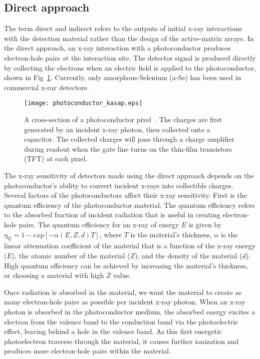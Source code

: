 \subsection{Direct approach}
The term direct and indirect refers to the outputs of initial x-ray interactions with the detection material rather than the design of the active-matrix arrays.  In the direct approach, an x-ray interaction with a photoconductor produces electron-hole pairs at the interaction site.  The detector signal is produced directly by collecting the electrons when an electric field is applied to the photoconductor, shown in Fig~\ref{fig:photoconductor_cross_section}.  Currently, only amorphous-Selenium (a-Se) has been used in commercial x-ray detectors.
%
\begin{figure}[ht]
\centering
\texttt{[image: photoconductor\_kasap.eps]}
\caption{A cross-section of a photoconductor pixel~\citep{kasap2006}.  The charges are first generated by an incident x-ray photon, then collected onto a capacitor.  The collected charges will pass through a charge amplifier during readout when the gate line turns on the thin-film transistors (TFT) at each pixel.}
\label{fig:photoconductor_cross_section}
\end{figure}

The x-ray sensitivity of detectors made using the direct approach depends on the photoconductor's ability to convert incident x-rays into collectible charges.  Several factors of the photoconductors affect their x-ray sensitivity.  First is the quantum efficiency of the photoconductor material.  The quantum efficiency refers to the absorbed fraction of incident radiation that is useful in creating electron-hole pairs.  The quantum efficiency for an x-ray of energy $E$ is given by $\eta_Q = 1 - exp[-\alpha (E, Z, d) T]$, where $T$ is the material's thickness, $\alpha$ is the linear attenuation coefficient of the material that is a function of the x-ray energy ($E$), the atomic number of the material ($Z$), and the density of the material ($d$).  High quantum efficiency can be achieved by increasing the material's thickness, or choosing a material with high $Z$ value.  

Once radiation is absorbed in the material, we want the material to create as many electron-hole pairs as possible per incident x-ray photon.  When an x-ray photon is absorbed in the photoconductor medium, the absorbed energy excites a electron from the valence band to the conduction band via the photoelectric effect, leaving behind a hole in the valence band.  As this first energetic photoelectron traverse through the material, it causes further ionization and produces more electron-hole pairs within the material.  

